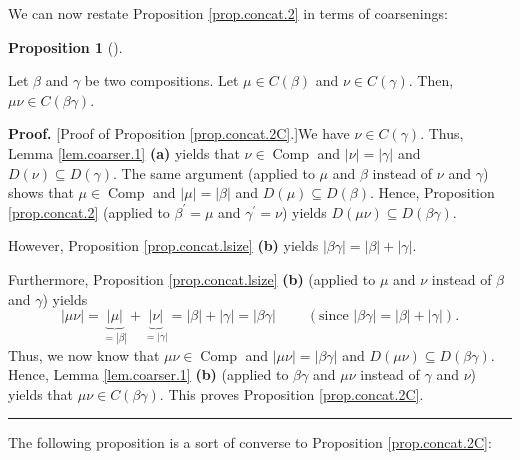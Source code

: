 \documentclass[numbers=enddot,12pt,final,onecolumn,notitlepage]{scrartcl}%
\theoremstyle{definition}
\newtheorem{prop}[theo]{Proposition}
\newenvironment{proposition}[1][]
{\begin{prop}[#1]\begin{leftbar}}
{\end{leftbar}\end{prop}}
\newenvironment{proof}[1][Proof]{\noindent\textbf{#1.} }{\ \rule{0.5em}{0.5em}}
\begin{document}
We can now restate Proposition \ref{prop.concat.2} in terms of coarsenings:

\begin{proposition}
\label{prop.concat.2C}Let $\beta$ and $\gamma$ be two compositions. Let
$\mu\in C\left(  \beta\right)  $ and $\nu\in C\left(  \gamma\right)  $. Then,
$\mu\nu\in C\left(  \beta\gamma\right)  $.
\end{proposition}

\begin{proof}
[Proof of Proposition \ref{prop.concat.2C}.]We have $\nu\in C\left(
\gamma\right)  $. Thus, Lemma \ref{lem.coarser.1} \textbf{(a)} yields that
$\nu\in\operatorname*{Comp}$ and $\left\vert \nu\right\vert =\left\vert
\gamma\right\vert $ and $D\left(  \nu\right)  \subseteq D\left(
\gamma\right)  $. The same argument (applied to $\mu$ and $\beta$ instead of
$\nu$ and $\gamma$) shows that $\mu\in\operatorname*{Comp}$ and $\left\vert
\mu\right\vert =\left\vert \beta\right\vert $ and $D\left(  \mu\right)
\subseteq D\left(  \beta\right)  $. Hence, Proposition \ref{prop.concat.2}
(applied to $\beta^{\prime}=\mu$ and $\gamma^{\prime}=\nu$) yields $D\left(
\mu\nu\right)  \subseteq D\left(  \beta\gamma\right)  $.

However, Proposition \ref{prop.concat.lsize} \textbf{(b)} yields $\left\vert
\beta\gamma\right\vert =\left\vert \beta\right\vert +\left\vert \gamma
\right\vert $.

Furthermore, Proposition \ref{prop.concat.lsize} \textbf{(b)} (applied to
$\mu$ and $\nu$ instead of $\beta$ and $\gamma$) yields
\[
\left\vert \mu\nu\right\vert =\underbrace{\left\vert \mu\right\vert
}_{=\left\vert \beta\right\vert }+\underbrace{\left\vert \nu\right\vert
}_{=\left\vert \gamma\right\vert }=\left\vert \beta\right\vert +\left\vert
\gamma\right\vert =\left\vert \beta\gamma\right\vert
\ \ \ \ \ \ \ \ \ \ \left(  \text{since }\left\vert \beta\gamma\right\vert
=\left\vert \beta\right\vert +\left\vert \gamma\right\vert \right)  .
\]
Thus, we now know that $\mu\nu\in\operatorname*{Comp}$ and $\left\vert \mu
\nu\right\vert =\left\vert \beta\gamma\right\vert $ and $D\left(  \mu
\nu\right)  \subseteq D\left(  \beta\gamma\right)  $. Hence, Lemma
\ref{lem.coarser.1} \textbf{(b)} (applied to $\beta\gamma$ and $\mu\nu$
instead of $\gamma$ and $\nu$) yields that $\mu\nu\in C\left(  \beta
\gamma\right)  $. This proves Proposition \ref{prop.concat.2C}.
\end{proof}

The following proposition is a sort of converse to Proposition
\ref{prop.concat.2C}:
\end{document}
